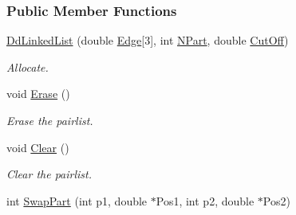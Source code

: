 \subsubsection*{Public Member Functions}
\begin{DoxyCompactItemize}
\item 
\hyperlink{classDdLinkedList_aaf16124b5aa0b2a6597b9363f1a1c247}{Dd\+Linked\+List} (double \hyperlink{classDomDecBasics_a8895c89605e91c6cf7430bad336f77c6}{Edge}\mbox{[}3\mbox{]}, int \hyperlink{classDomDecBasics_abdcc792391d8c5092471dff191de47f4}{N\+Part}, double \hyperlink{classDomDecBasics_af2411aba2dd63fa22b1bc279653ff7a0}{Cut\+Off})
\begin{DoxyCompactList}\small\item\em Allocate. \end{DoxyCompactList}\item 
void \hyperlink{classDdLinkedList_a98ae2e78109ea826eea71da14c37ce95}{Erase} ()
\begin{DoxyCompactList}\small\item\em Erase the pairlist. \end{DoxyCompactList}\item 
void \hyperlink{classDdLinkedList_aa71d36872f416feaa853788a7a7a7ef8}{Clear} ()\hypertarget{classDdLinkedList_aa71d36872f416feaa853788a7a7a7ef8}{}\label{classDdLinkedList_aa71d36872f416feaa853788a7a7a7ef8}

\begin{DoxyCompactList}\small\item\em Clear the pairlist. \end{DoxyCompactList}\item 
int \hyperlink{classDdLinkedList_ae468af31d1a530ba0fdaef088c4b9c00}{Swap\+Part} (int p1, double $\ast$Pos1, int p2, double $\ast$Pos2)\hypertarget{classDdLinkedList_ae468af31d1a530ba0fdaef088c4b9c00}{}\label{classDdLinkedList_ae468af31d1a530ba0fdaef088c4b9c00}


\end{DoxyCompactItemize}
